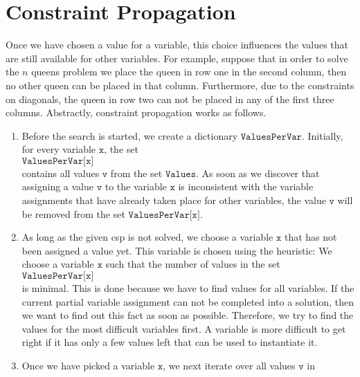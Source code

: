 \section{Constraint Propagation}
Once we have chosen a value for a variable, this choice influences the values that are still available for
other variables. 
For example, suppose that in order to solve the $n$ queens problem we place the queen in row one in the second
column, then no other queen can be placed in 
that column.   Furthermore, due to the constraints on diagonals, the queen in row two can not be placed
in any of the first three columns.  Abstractly, constraint propagation works as follows.
\begin{enumerate}
\item Before the search is started, we create a dictionary $\texttt{ValuesPerVar}$.  Initially, for every variable
      $\texttt{x}$,  the set
      \\[0.2cm]
      \hspace*{1.3cm}
      $\texttt{ValuesPerVar[x]}$ 
      \\[0.2cm]
      contains all values $\texttt{v}$ from the set $\texttt{Values}$.  As soon as we discover that assigning a
      value $\texttt{v}$ to the variable $\texttt{x}$ is inconsistent with the variable
      assignments that have already taken place for other variables, the value $\texttt{v}$ will be removed from the set
      $\texttt{ValuesPerVar[x]}$. 
\item As long as the given \ac{csp} is not solved,  we choose a variable $\texttt{x}$ that has not been assigned a
      value yet.  This variable is chosen using the 
       heuristic:  We choose a
      variable $\texttt{x}$ such that the number of values in the set
      \\[0.2cm]
      \hspace*{1.3cm}
      $\texttt{ValuesPerVar[x]}$ 
      \\[0.2cm]
      is minimal.  This is done because we have to
      find values for all variables.  If the current partial variable assignment can not be completed into a
      solution, then we want to find out this fact as soon as possible.  Therefore, we try to find the values
      for the most difficult variables first.  A variable is more difficult to get right if it has only a few
      values left that can be used to instantiate it.
\item Once we have picked a variable $\texttt{x}$, we next iterate over all values $\texttt{v}$ in

\end{enumerate}
